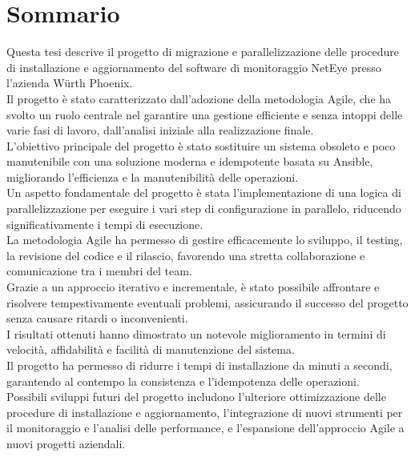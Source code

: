 \chapter*{Sommario}
\label{cha:sommario}

Questa tesi descrive il progetto di migrazione e parallelizzazione delle
procedure di installazione e aggiornamento del software di monitoraggio NetEye
presso l'azienda Würth Phoenix.\\ Il progetto è stato caratterizzato dall'adozione
della metodologia Agile, che ha svolto un ruolo centrale nel garantire una gestione
efficiente e senza intoppi delle varie fasi di lavoro, dall'analisi iniziale
alla realizzazione finale.\\ L'obiettivo principale del progetto è stato
sostituire un sistema obsoleto e poco manutenibile con una soluzione moderna e
idempotente basata su Ansible, migliorando l'efficienza e la manutenibilità delle
operazioni.\\ Un aspetto fondamentale del progetto è stata l'implementazione di una
logica di parallelizzazione per eseguire i vari step di configurazione in parallelo,
riducendo significativamente i tempi di esecuzione.\\ La metodologia Agile ha
permesso di gestire efficacemente lo sviluppo, il testing, la revisione del
codice e il rilascio, favorendo una stretta collaborazione e comunicazione tra i
membri del team.\\ Grazie a un approccio iterativo e incrementale, è stato
possibile affrontare e risolvere tempestivamente eventuali problemi, assicurando
il successo del progetto senza causare ritardi o inconvenienti.\\ I risultati ottenuti
hanno dimostrato un notevole miglioramento in termini di velocità, affidabilità
e facilità di manutenzione del sistema.\\ Il progetto ha permesso di ridurre i
tempi di installazione da minuti a secondi, garantendo al contempo la consistenza
e l'idempotenza delle operazioni.\\ Possibili sviluppi futuri del progetto includono
l'ulteriore ottimizzazione delle procedure di installazione e aggiornamento, l'integrazione
di nuovi strumenti per il monitoraggio e l'analisi delle performance, e l'espansione
dell'approccio Agile a nuovi progetti aziendali.